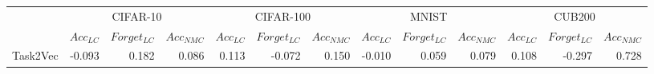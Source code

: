 \begin{tabular}{lrrrrrrrrrrrr}
\toprule
{} & \multicolumn{3}{c}{CIFAR-10} & \multicolumn{3}{c}{CIFAR-100} & \multicolumn{3}{c}{MNIST} & \multicolumn{3}{c}{CUB200} \\
{} & $Acc_{LC}$ & $Forget_{LC}$ & $Acc_{NMC}$ & $Acc_{LC}$ & $Forget_{LC}$ & $Acc_{NMC}$ & $Acc_{LC}$ & $Forget_{LC}$ & $Acc_{NMC}$ & $Acc_{LC}$ & $Forget_{LC}$ & $Acc_{NMC}$ \\
\midrule
Task2Vec &     -0.093 &         0.182 &       0.086 &      0.113 &        -0.072 &       0.150 &     -0.010 &         0.059 &       0.079 &      0.108 &        -0.297 &       0.728 \\
\bottomrule
\end{tabular}
